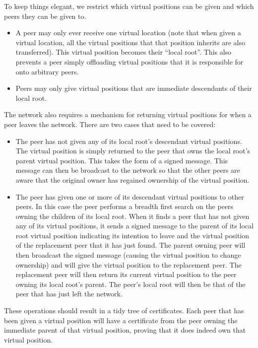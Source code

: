 \documentclass[ %
                    author={Luke Murray},
                supervisor={Dr. Simon Hollis},
                     title={Shadow Peer-to-Peer Networks},
                  subtitle={},
                    degree={MEng},
                      year={2013} ]{thesis}
\begin{document}
To keep things elegant, we restrict which virtual positions can be given and which peers they can be given to.
\begin{itemize}
\item A peer may only ever receive one virtual location (note that when given a virtual location, all the virtual positions that that position inherits are also transferred). This virtual position becomes their ``local root''. This also prevents a peer simply offloading virtual positions that it is responsible for onto arbitrary peers.
\item Peers may only give virtual positions that are immediate descendants of their local root.
\end{itemize}

The network also requires a mechanism for returning virtual positions for when a peer leaves the network. There are two cases that need to be covered:
\begin{itemize}
\item The peer has not given any of its local root's descendant virtual positions. The virtual position is simply returned to the peer that owns the local root's parent virtual position. This takes the form of a signed message. This message can then be broadcast to the network so that the other peers are aware that the original owner has regained ownership of the virtual position.
\item The peer has given one or more of its descendant virtual positions to other peers. In this case the peer performs a breadth first search on the peers owning the children of its local root. When it finds a peer that has not given any of its virtual positions, it sends a signed message to the parent of its local root virtual position indicating its intention to leave and the virtual position of the replacement peer that it has just found. The parent owning peer will then broadcast the signed message (causing the virtual position to change ownership) and will give the virtual position to the replacement peer. The replacement peer will then return its current virtual position to the peer owning its local root's parent. The peer's local root will then be that of the peer that has just left the network.
\end{itemize}

These operations should result in a tidy tree of certificates. Each peer that has been given a virtual position will have a certificate from the peer owning the immediate parent of that virtual position, proving that it does indeed own that virtual position.
\end{document}

